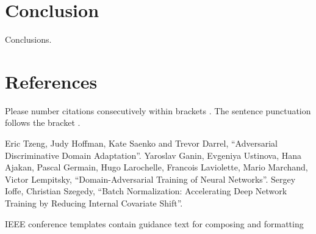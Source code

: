 \documentclass[conference]{IEEEtran}
\begin{document}
\section{Conclusion}
Conclusions.


\section*{References}

Please number citations consecutively within brackets \cite{b1}. The
sentence punctuation follows the bracket \cite{b2}.

\begin{thebibliography}{00}
 Eric Tzeng, Judy Hoffman, Kate Saenko and Trevor Darrel, ``Adversarial Discriminative Domain Adaptation''.
 Yaroslav Ganin, Evgeniya Ustinova, Hana Ajakan, Pascal Germain, Hugo Larochelle, Francois Laviolette,
    Mario Marchand, Victor Lempitsky, ``Domain-Adversarial Training of Neural Networks''.
 Sergey Ioffe, Christian Szegedy, ``Batch Normalization: Accelerating Deep Network Training by Reducing Internal Covariate Shift''.
    
\end{thebibliography}
\vspace{12pt}
\color{red}
IEEE conference templates contain guidance text for composing and formatting
\end{document}
